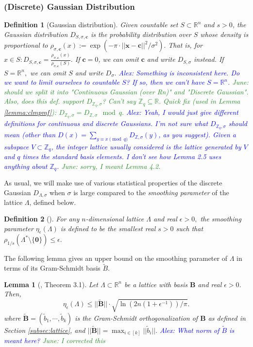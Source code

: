 \documentclass[11pt]{article}
\newcommand{\Z}{\mathbb{Z}}
\newcommand{\R}{\mathbb{R}}
\newcommand{\dabs}[1]{||#1 ||}
\newtheorem{lemma}{Lemma}[section]
\newtheorem{definition}{Definition}[section]
\newcommand{\anote}[1]{\textcolor{blue}{Alex: {#1}}}
\newcommand{\jnote}[1]{\textcolor{ForestGreen}{June: {#1}}}
\begin{document}
\subsubsection{(Discrete) Gaussian Distribution}
\begin{definition}[Gaussian distribution]
Given countable set $S \subset \R^n$ and $s>0$, the Gaussian distribution $D_{S,\sigma, \textbf{c}}$ is the probability distribution over $S$ whose density is proportional to $\rho_{\sigma,\textbf{c}}(x):=\exp(-\pi\cdot \dabs{\textbf{x}- \textbf{c}}^2/\sigma^2).$ %
That is, for $x \in S: D_{S,\sigma, \textbf{c}} = \frac{\rho_{\sigma,\textbf{c}}(x)}{\rho_{\sigma,\textbf{c}}(S)}.$
If $\textbf{c} = 0$, we can omit $\textbf{c}$ and write $D_{S, \sigma}$ instead. If $S = \R^n,$ we can omit $S$ and write $D_{\sigma}.$ \anote{Something is inconsistent here. Do we want to limit ourselves to countable $S$? If so, then we can't have $S = \mathbb R^n$.} \jnote{should we split it into "Continuous Gaussian (over Rn)" and "Discrete Gaussian". Also, does this def. support $D_{\Z_q, \sigma}$? Can't say $\Z_q \subseteq \R.$ Quick fix (used in Lemma \ref{lemma:clmpmf}): $D_{\Z_q, \sigma} = D_{\Z, \sigma} \mod q.$} \anote{Yeah, I would just give different definitions for continuous and discrete Gaussians. I'm not sure what $D_{\Z_q, \sigma}$ should mean (other than $D(x) = \sum_{y\equiv x \pmod q} D_{\Z, \sigma}(y)$, as you suggest). Given a subspace $V \subset \Z_q$, the integer lattice usually considered is the lattice generated by $V$ and $q$ times the standard basis elements. I don't see how Lemma 2.5 uses anything about $\Z_q$.} \jnote{sorry, I meant Lemma 4.2.}
\end{definition}
As usual, we will make use of various statistical properties of the discrete Gaussian $D_{\Lambda, \sigma}$ when $\sigma$ is large compared to the \emph{smoothing parameter} of the lattice $\Lambda$, defined below. 
\begin{definition}[\cite{MR07}] \label{def:eta}
For any $n$-dimensional lattice $\Lambda$ and real $\epsilon > 0,$ the smoothing parameter $\eta_{\epsilon}(\Lambda)$ is defined to be the smallest real $s> 0$ such that $\rho_{1/s} (\Lambda^*\setminus \{\textbf{0}\}) \leq \epsilon.$ 
\end{definition}
The following lemma gives an upper bound on the smoothing parameter of $\Lambda$ in terms of its Gram-Schmidt basis $\tilde B$. 
\begin{lemma}[\cite{trapdoor}, Theorem 3.1] \label{lemma:eta}
Let $\Lambda \subset \R^n$ be a lattice with basis $\mathbf{B}$ and real $\epsilon > 0$. Then, 
\[
\eta_{\epsilon} (\Lambda) \leq \dabs{\tilde{\mathbf{B}}} \cdot \sqrt{\ln (2n(1+\epsilon^{-1}) )/ \pi}.
\]
where $\tilde{\mathbf{B}} = (\tilde{b}_1, \cdots, \tilde{b}_k)$ is the Gram-Schmidt orthogonalization of $\mathbf{B}$ as defined in Section \ref{subsec:lattice}, and $\dabs{\tilde{\mathbf{B}}}  = \max_{i\in [k]} \dabs{\tilde{b}_i}.$
\anote{What norm of $\tilde B$ is meant here?} \jnote{I corrected this}

\end{lemma}
\end{document}
